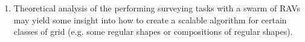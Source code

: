 \begin{enumerate}
    \item Theoretical analysis of the performing surveying tasks with a swarm of RAVs may yield some insight into how to create a scalable algorithm for certain classes of grid (e.g. some regular shapes or compositions of regular shapes).

\end{enumerate}

